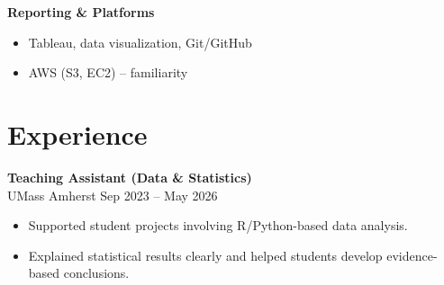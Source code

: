 \documentclass[10pt, letterpaper]{article}
\begin{document}
\textbf{Reporting \& Platforms}
\begin{itemize}
    \item Tableau, data visualization, Git/GitHub
    \item AWS (S3, EC2) -- familiarity
\end{itemize}
   




    \section*{Experience}
    \textbf{Teaching Assistant (Data \& Statistics)} \\
UMass Amherst \hfill Sep 2023 -- May 2026
\begin{itemize}
    \item Supported student projects involving R/Python-based data analysis.
    \item Explained statistical results clearly and helped students develop evidence-based conclusions.
\end{itemize}
\end{document}
